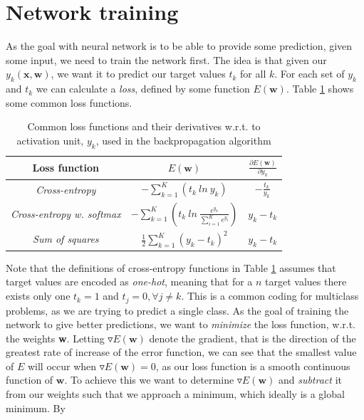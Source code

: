 \section{Network training}
As the goal with neural network is to be able to provide some prediction, given
some input, we need to train the network first. The idea is that given our $y_k
(\textbf{x}, \textbf{w})$, we want it to predict our target values $t_k$ for all
$k$. For each set of $y_k$ and $t_k$ we can calculate a \emph{loss}, defined by
some function $E(\textbf{w})$. Table \ref{tab:loss} shows some common loss
functions.
\begin{table}[!htbp]
	\centering
	\begin{tabular}{|c||c|c|} \hline
		\textbf{Loss function} & $E(\textbf{w})$ & $\frac{\partial
			E(\textbf{w})}{\partial y_k} $   \\ \hline \hline
		\textit{Cross-entropy} & $- \sum^K_{k=1} \left( t_k \ ln \ y_k \right)$  &
		$-\frac{t_k}{y_k}$ \\  \hline
		\textit{Cross-entropy w. softmax} & $- \sum^K_{k=1} \left( t_k \ ln \
		\frac{e^{y_k}}{\sum^K_{i = 1} e^{y_i}} \right)$  & $y_k-t_k$ \\  \hline
		\textit{Sum of squares} & $\frac{1}{2} \sum_{k=1}^K (y_k - t_k)^2$  &
		$y_k-t_k$ \\  \hline
	\end{tabular}
	\caption{Common loss functions and their derivatives w.r.t. to activation unit,
		$y_k$, used in the backpropagation algorithm}
	\label{tab:loss}
\end{table}\newline 
Note that the definitions of cross-entropy functions in Table \ref{tab:loss}
assumes that target values are encoded as \emph{one-hot}, meaning that for a $n$
target values there exists only one $t_k = 1$ and $t_j = 0, \forall j\neq k$.
This is a common coding for multiclass problems, as we are trying to predict a
single class.
As the goal of training the network to give better predictions, we want to
\emph{minimize} the loss function, w.r.t. the weights \textbf{w}. Letting
$\triangledown E(\textbf{w})$ denote the gradient, that is the direction of the
greatest rate of increase of the error function, we can see that the smallest
value of $E$ will occur when $\triangledown E(\textbf{w}) = 0$, as our loss
function is a smooth continuous function of $\textbf{w}$. To achieve this we
want to determine $\triangledown E(\textbf{w})$ and \emph{subtract} it from our
weights such that we approach a minimum, which ideally is a global minimum. By

